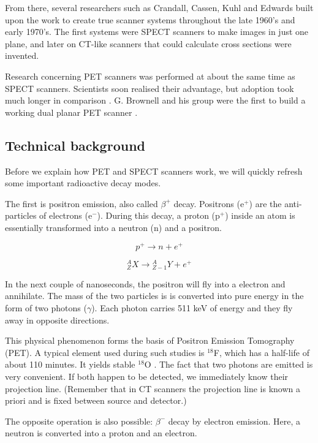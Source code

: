 From there, several researchers such as Crandall, Cassen, Kuhl and Edwards built
upon the work to create true scanner systems throughout the late 1960's and
early 1970's. The first systems were SPECT scanners to make images in just one
plane, and later on CT-like scanners that could calculate cross sections were
invented.

Research concerning PET scanners was performed at about the same time
as SPECT scanners. Scientists soon realised their advantage, but adoption took
much longer in comparison \cite{petreview}. G. Brownell and his group were the
first to build a working dual planar PET scanner \cite{brownell}.

\subsection{Technical background}
Before we explain how PET and SPECT scanners work, we will quickly refresh some
important radioactive decay modes.

The first is positron emission, also called $\beta^+$ decay. Positrons (e$^+$)
are the anti-particles of electrons (e$^-$). During this decay, a proton (p$^+$)
inside an atom is essentially transformed into a neutron (n) and a positron.

\begin{equation}
	p^+ \rightarrow n + e^+
\end{equation}

\begin{equation}
	{}_Z^AX \rightarrow {}_{Z-1}^AY + e^+
\end{equation}

In the next couple of nanoseconds, the positron will fly into a electron and
annihilate. The mass of the two particles is is converted into pure energy in
the form of two photons ($\gamma$). Each photon carries 511 keV of energy and
they fly away in opposite directions.

This physical phenomenon forms the basis of Positron Emission Tomography (PET).
A typical element used during such studies is $^{18}$F, which has a half-life of
about 110 minutes. It yields stable $^{18}$O \cite{suetens}. The fact that two
photons are emitted is very convenient. If both happen to be detected, we
immediately know their projection line. (Remember that in CT scanners the
projection line is known a priori and is fixed between source and detector.)

The opposite operation is also possible: $\beta^-$ decay by electron emission.
Here, a neutron is converted into a proton and an electron.

